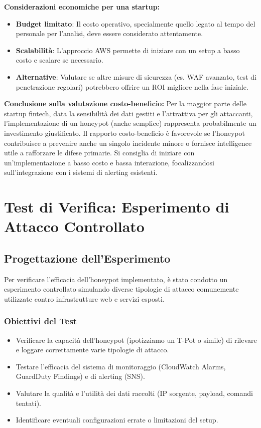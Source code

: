 \documentclass[a4paper,12pt]{report}
\begin{document}
\textbf{Considerazioni economiche per una startup:}
\begin{itemize}
    \item \textbf{Budget limitato}: Il costo operativo, specialmente quello legato al tempo del personale per l'analisi, deve essere considerato attentamente.
    \item \textbf{Scalabilità}: L'approccio AWS permette di iniziare con un setup a basso costo e scalare se necessario.
    \item \textbf{Alternative}: Valutare se altre misure di sicurezza (es. WAF avanzato, test di penetrazione regolari) potrebbero offrire un ROI migliore nella fase iniziale.
\end{itemize}

\textbf{Conclusione sulla valutazione costo-beneficio:}
Per la maggior parte delle startup fintech, data la sensibilità dei dati gestiti e l'attrattiva per gli attaccanti, l'implementazione di un honeypot (anche semplice) rappresenta probabilmente un investimento giustificato. Il rapporto costo-beneficio è favorevole se l'honeypot contribuisce a prevenire anche un singolo incidente minore o fornisce intelligence utile a rafforzare le difese primarie. Si consiglia di iniziare con un'implementazione a basso costo e bassa interazione, focalizzandosi sull'integrazione con i sistemi di alerting esistenti.

\section{Test di Verifica: Esperimento di Attacco Controllato}
\label{sec:test_verifica}

\subsection{Progettazione dell'Esperimento}
\label{subsec:progettazione_test}

Per verificare l'efficacia dell'honeypot implementato, è stato condotto un esperimento controllato simulando diverse tipologie di attacco comunemente utilizzate contro infrastrutture web e servizi esposti.

\subsubsection{Obiettivi del Test}
\label{subsubsec:obiettivi_test}
\begin{itemize}
    \item Verificare la capacità dell'honeypot (ipotizziamo un T-Pot o simile) di rilevare e loggare correttamente varie tipologie di attacco.
    \item Testare l'efficacia del sistema di monitoraggio (CloudWatch Alarms, GuardDuty Findings) e di alerting (SNS).
    \item Valutare la qualità e l'utilità dei dati raccolti (IP sorgente, payload, comandi tentati).
    \item Identificare eventuali configurazioni errate o limitazioni del setup.
\end{itemize}
\end{document}
